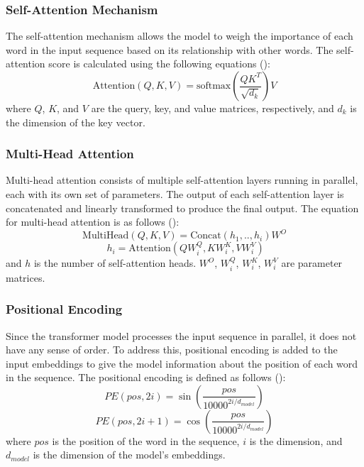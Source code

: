 \documentclass[10pt]{article}
\begin{document}
\begin{multicols}{2}
\subsubsection{Self-Attention Mechanism}
The self-attention mechanism allows the model to weigh the importance of each word in the input sequence based on its relationship with other words. The self-attention score is calculated using the following equations (\cite{vaswani2017attention}):
\begin{equation}
    \text{Attention}(Q,K,V) = \text{softmax}\left(\frac{QK^T}{\sqrt{d_k}}\right)V
\end{equation}
where \( Q \), \( K \), and \( V \) are the query, key, and value matrices, respectively, and \( d_k \) is the dimension of the key vector.

\subsubsection{Multi-Head Attention}
Multi-head attention consists of multiple self-attention layers running in parallel, each with its own set of parameters. The output of each self-attention layer is concatenated and linearly transformed to produce the final output. The equation for multi-head attention is as follows (\cite{vaswani2017attention}):
\begin{equation}
    \text{MultiHead}(Q,K,V) = \text{Concat}(h_1, .. ,h_i)W^O 
\end{equation}
\begin{equation}
    \ h_i = \text{Attention}(QW_i^Q, KW_i^K, VW_i^V)
\end{equation}
and \( h \) is the number of self-attention heads. \( W^O \), \( W_i^Q \), \( W_i^K \), \( W_i^V \) are parameter matrices.


\subsubsection{Positional Encoding}
Since the transformer model processes the input sequence in parallel, it does not have any sense of order. To address this, positional encoding is added to the input embeddings to give the model information about the position of each word in the sequence. The positional encoding is defined as follows (\cite{vaswani2017attention}):
\begin{equation}
    PE(pos, 2i) = \sin\left(\frac{pos}{10000^{2i/d_{model}}}\right)
\end{equation}
\begin{equation}
    PE(pos, 2i+1) = \cos\left(\frac{pos}{10000^{2i/d_{model}}}\right)
\end{equation}
where \( pos \) is the position of the word in the sequence, \( i \) is the dimension, and \( d_{model} \) is the dimension of the model's embeddings.


\end{multicols}
\end{document}
